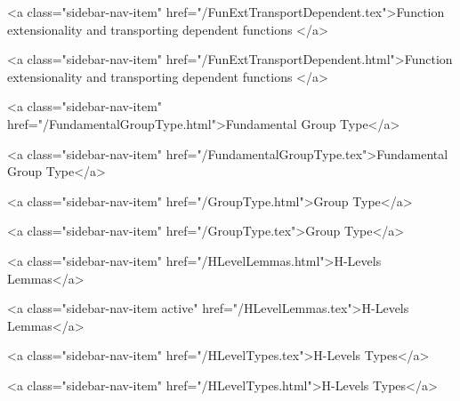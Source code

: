       
    
      
        
          <a class="sidebar-nav-item" href="/FunExtTransportDependent.tex">Function extensionality and transporting dependent functions </a>
        
      
    
      
        
          <a class="sidebar-nav-item" href="/FunExtTransportDependent.html">Function extensionality and transporting dependent functions </a>
        
      
    
      
        
          <a class="sidebar-nav-item" href="/FundamentalGroupType.html">Fundamental Group Type</a>
        
      
    
      
        
          <a class="sidebar-nav-item" href="/FundamentalGroupType.tex">Fundamental Group Type</a>
        
      
    
      
        
          <a class="sidebar-nav-item" href="/GroupType.html">Group Type</a>
        
      
    
      
        
          <a class="sidebar-nav-item" href="/GroupType.tex">Group Type</a>
        
      
    
      
        
          <a class="sidebar-nav-item" href="/HLevelLemmas.html">H-Levels Lemmas</a>
        
      
    
      
        
          <a class="sidebar-nav-item active" href="/HLevelLemmas.tex">H-Levels Lemmas</a>
        
      
    
      
        
          <a class="sidebar-nav-item" href="/HLevelTypes.tex">H-Levels Types</a>
        
      
    
      
        
          <a class="sidebar-nav-item" href="/HLevelTypes.html">H-Levels Types</a>
        
      
    
      
        
